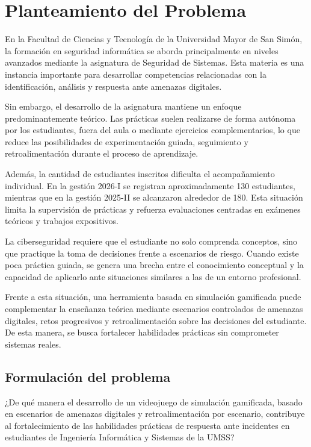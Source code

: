 \section{Planteamiento del Problema}

En la Facultad de Ciencias y Tecnología de la Universidad Mayor de San Simón, la formación en seguridad informática se aborda principalmente en niveles avanzados mediante la asignatura de Seguridad de Sistemas. Esta materia es una instancia importante para desarrollar competencias relacionadas con la identificación, análisis y respuesta ante amenazas digitales.

Sin embargo, el desarrollo de la asignatura mantiene un enfoque predominantemente teórico. Las prácticas suelen realizarse de forma autónoma por los estudiantes, fuera del aula o mediante ejercicios complementarios, lo que reduce las posibilidades de experimentación guiada, seguimiento y retroalimentación durante el proceso de aprendizaje.

Además, la cantidad de estudiantes inscritos dificulta el acompañamiento individual. En la gestión 2026-I se registran aproximadamente 130 estudiantes, mientras que en la gestión 2025-II se alcanzaron alrededor de 180. Esta situación limita la supervisión de prácticas y refuerza evaluaciones centradas en exámenes teóricos y trabajos expositivos.

La ciberseguridad requiere que el estudiante no solo comprenda conceptos, sino que practique la toma de decisiones frente a escenarios de riesgo. Cuando existe poca práctica guiada, se genera una brecha entre el conocimiento conceptual y la capacidad de aplicarlo ante situaciones similares a las de un entorno profesional.

Frente a esta situación, una herramienta basada en simulación gamificada puede complementar la enseñanza teórica mediante escenarios controlados de amenazas digitales, retos progresivos y retroalimentación sobre las decisiones del estudiante. De esta manera, se busca fortalecer habilidades prácticas sin comprometer sistemas reales.

\subsection*{Formulación del problema}

\noindent ¿De qué manera el desarrollo de un videojuego de simulación gamificada, basado en escenarios de amenazas digitales y retroalimentación por escenario, contribuye al fortalecimiento de las habilidades prácticas de respuesta ante incidentes en estudiantes de Ingeniería Informática y Sistemas de la UMSS?

